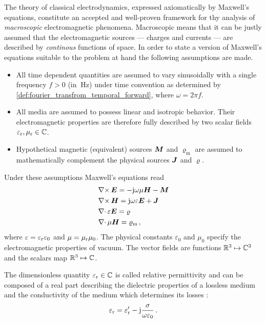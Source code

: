 The theory of classical electrodynamics, expressed axiomatically by Maxwell's
equations, constitute an accepted and well-proven framework for thy analysis of
\emph{macroscopic} electromagnetic phenomena.
Macroscopic means that it can be justly assumed that the electromagnetic
sources --- charges and currents --- are described by \emph{continous}
functions of space. 
In order to state a version of Maxwell's equations suitable to the problem at
hand the following assumptions are made.
\begin{itemize}
	\item All time dependent quantities are assumed to vary sinusoidally with
	a single frequency $f > 0$ (in $\SI{}{\hertz}$) under time convention
	as determined by \cref{def:fourier_transfrom_temporal_forward},
	where $\omega = 2\pi f$.
	\item All media are assumed to possess linear and isotropic behavior.
	Their electromagnetic properties are therefore fully described by two scalar
	fields $\varepsilon_{\mathrm{r}}, \mu_{\mathrm{r}} \in \mathbb{C}$.
	\item Hypothetical magnetic (equivalent) sources $\pvec{M}$ and
	$\varrho_\mathrm{m}$ are assumed to mathematically complement the physical
	sources $\pvec{J}$ and $\varrho$.
\end{itemize}
Under these assumptions Maxwell's equations read \cite{Chew1999}
\begin{subequations}\label{eq:mwe_fd}
	\begin{align}
		&\curl \pvec{E}
		= -\im\omega\mu\pvec{H} -\pvec{M} \label{eq:mwe_fd_faraday} \\
		&\curl \pvec{H}
		= \im\omega\varepsilon\pvec{E} + \pvec{J} \label{eq:mwe_fd_ampere} \\
		&\divergence \varepsilon\pvec{E}
		= \varrho \label{eq:mwe_fd_gauss} \\
		&\divergence \mu\pvec{H}
		= \varrho_\mathrm{m} \,, \label{eq:mwe_fd_gauss_magnetic}
	\end{align}
\end{subequations}
where $\varepsilon = \varepsilon_{\mathrm{r}} \varepsilon_0$ and $\mu = \mu_{\mathrm{r}} \mu_0$.
The physical constants $\varepsilon_0$ and $\mu_0$ specify the
electromagnetic properties of vacuum.
The vector fields are functions $\mathbb{R}^3 \mapsto \mathbb{C}^3$ and the scalars map
$\mathbb{R}^3 \mapsto \mathbb{C}$.

The dimensionless quantity $\varepsilon_{\mathrm{r}} \in \mathbb{C}$ is called relative permittivity 
and can be composed of a real part describing the dielectric properties of a
lossless medium and the conductivity of the medium which determines its losses
\cite[p.~43]{Jin2015}:
\begin{equation}
	\varepsilon_{\mathrm{r}} = \varepsilon_{\mathrm{r}}^\prime - \mathrm{j} \frac{\sigma}{\omega \varepsilon_0} \,.
\end{equation}

